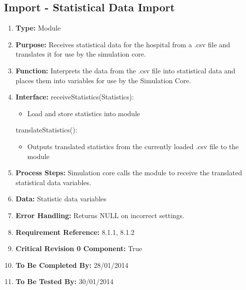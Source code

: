 \documentclass[paper=letter, fontsize=10pt]{scrartcl}
\numberwithin{equation}{section}		%
\numberwithin{figure}{section}			%
\numberwithin{table}{section}				%
\begin{document}
\subsection{Import - Statistical Data Import}
\begin{enumerate}[]
	\item \textbf{Type:} Module
	\item \textbf{Purpose:} Receives statistical data for the hospital from a .csv file and translates it for use by the simulation core.
	\item \textbf{Function:} Interprets the data from the .csv file into statistical data and places them into variables for use by the Simulation Core.  
	\item \textbf{Interface:} \newline
	receiveStatistics(Statistics):
	 	\begin{itemize}
	 		\item Load and store statistics into module
	 	\end{itemize}
	 translateStatistics():
	 	\begin{itemize}
	 		\item Outputs translated statistics from the currently loaded .csv file to the module
	 	\end{itemize}
	\item \textbf{Process Steps:} Simulation core calls the module to receive the translated statistical data variables.
	\item \textbf{Data:} Statistic data variables
	\item \textbf{Error Handling:} Returns NULL on incorrect settings.
	\item \textbf{Requirement Reference:} 8.1.1, 8.1.2
	\item \textbf{Critical Revision 0 Component:} True
	\item \textbf{To Be Completed By:} 28/01/2014
	\item \textbf{To Be Tested By:} 30/01/2014
\end{enumerate}
\end{document}
